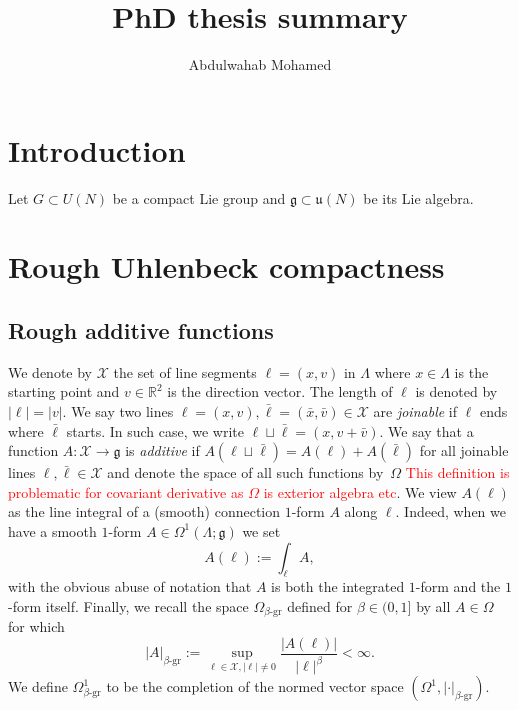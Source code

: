 \documentclass[12pt]{article}
\title{PhD thesis summary}
\author{Abdulwahab Mohamed}
\numberwithin{equation}{section}
\theoremstyle{definition}
\theoremstyle{remark}
\newcommand{\R}{\mathbb R}
\newcommand{\1}{\mathbf 1}
\newcommand{\<}{\langle}
\renewcommand{\>}{\rangle}
\newcommand{\gr}{\text{-}\mathrm{gr}}
\newcommand{\red}[1]{\textcolor{red}{#1}}
\newcommand{\cX}{\mathcal X}
\newcommand{\fg}{\mathfrak g}
\newcommand{\fu}{\mathfrak u}
\begin{document}
\maketitle
\section{Introduction}
Let $G\subset U(N)$ be a compact Lie group and $\fg\subset \fu(N)$ be its Lie algebra. 

\section{Rough Uhlenbeck compactness}

\subsection{Rough additive functions}

%
%
We denote by $\cX$ the set of line segments $\ell=(x,v)$ in $\Lambda$ where $x\in \Lambda$ is the starting point and $v\in\R^2$ is the direction vector. The length of $\ell$ is denoted by $|\ell|=|v|$. 
%
We say two lines $\ell=(x,v),\bar\ell=(\bar x,\bar v)\in\cX$ are \emph{joinable} if $\ell$ ends where $\bar\ell$ starts. In such case, we write $\ell\sqcup\bar\ell=(x,v+\bar v)$. We say that a function $A:\cX\to \fg$ is \emph{additive} if $A(\ell\sqcup\bar\ell)=A(\ell)+A(\bar\ell)$ for all joinable lines $\ell,\bar\ell\in\cX$ and denote the space of all such functions by~$\Omega$ \red{This definition is problematic for covariant derivative as $\Omega$ is exterior algebra etc}.  
%
We view $A(\ell)$ as the line integral of a (smooth) connection $1$-form $A $ along $\ell$. Indeed, when we have a smooth $1$-form $A\in\Omega^1 (\Lambda;\fg)$ we set
\[
A(\ell):=\int_\ell A,
\]
with the obvious abuse of notation that $A$ is both the integrated $1$-form and the $1$-form itself. 
%
Finally, we recall the space $\Omega_{\beta\gr}$ defined for $\beta\in (0,1]$ by all $A\in\Omega$ for which
\[
|A|_{\beta\gr}:=\sup_{\ell\in\cX,|\ell|\neq 0}\frac{|A(\ell)|}{|\ell|^\beta}<\infty.
\]
We define $\Omega^1_{\beta\gr}$ to be the completion of the normed vector space $(\Omega^1,|\cdot|_{\beta\gr})$. 
\end{document}
